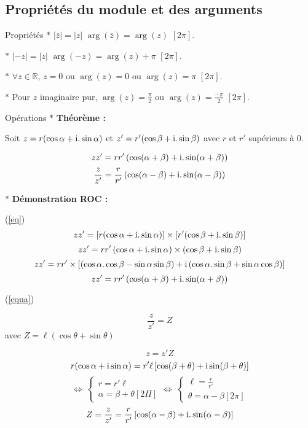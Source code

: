 \subsection{Propriétés du module et des arguments}
\begin{bclogo}{Propriétés}
$\ast$ $|\overline{z}|=|z|$ $\arg (\overline{z})=\arg (z)$ $[2\pi]$.

$\ast$ $|-z|=|z|$ $\arg (-z)=\arg (z) +\pi$ $[2\pi]$.

$\ast$ $\forall z\in \mathbb{R}$, $z=0$ ou $\arg (z) =0$ ou $\arg (z) =\pi$ $[2\pi]$.

$\ast$ Pour $z$ imaginaire pur, $\arg (z)=\frac{\pi}{2}$ ou $\arg (z)=\frac{-\pi}{2}$ $[2\pi]$.
\end{bclogo}

\medskip

\begin{bclogo}{Opérations}
$\ast$ \textbf{Théorème :}

Soit $z=r(\cos \alpha +\mathrm{i} .\sin \alpha)$ et $z'=r'(\cos \beta+\mathrm{i} .\sin \beta)$ avec $r$ et $r'$ supérieurs à $0$.

\begin{equation}\label{eq} zz'=rr'\left( \cos (\alpha +\beta ) +\mathrm{i} .\sin (\alpha +\beta )\right) \end{equation}
\begin{equation}\label{equa}\frac{z}{z'}=\frac{r}{r'}\left( \cos (\alpha -\beta) +\mathrm{i} .\sin (\alpha -\beta)\right) \end{equation}

$\ast$ \textbf{Démonstration ROC :}

(\ref{eq})
\[zz'= \left[ r(\cos \alpha +\mathrm{i} .\sin \alpha)\right] \times \left[ r'(\cos \beta+\mathrm{i} .\sin \beta)\right] \]
\[zz'= rr'\left( \cos \alpha +\mathrm{i} .\sin \alpha\right) \times \left( \cos \beta+\mathrm{i} .\sin \beta\right) \]
\[zz'=rr'\times \left[ \left( \cos \alpha .\cos \beta - \sin \alpha \sin \beta \right) +\mathrm{i}  \left( \cos \alpha .\sin \beta + \sin \alpha \cos \beta\right) \right] \]
\[zz'=rr'\left( \cos (\alpha +\beta ) +\mathrm{i} .\sin (\alpha +\beta )\right) \]

(\ref{equa})

\[\frac{z}{z'}=Z\]
avec $Z=\ell (\cos \theta + \sin \theta)$

\[z=z'Z\]
\[r(\cos \alpha +\mathrm{i} \sin \alpha) =r' \ell \left[ \cos (\beta + \theta)+\mathrm{i} \sin (\beta +\theta)\right] \]
\[\Longleftrightarrow\;\left\lbrace\begin{array}{l} r=r'\ell \\ \alpha =\beta +\theta [2\Pi] \end{array}\right. \Longleftrightarrow\;\left\lbrace\begin{array}{l} \ell =\frac{r}{r'} \\ \theta=\alpha -\beta [2\pi] \end{array}\right.\]
\[Z=\frac{z}{z'}=\frac{r}{r'}\left[ \cos (\alpha -\beta)+\mathrm{i} .\sin (\alpha -\beta)\right] \]

\end{bclogo}

